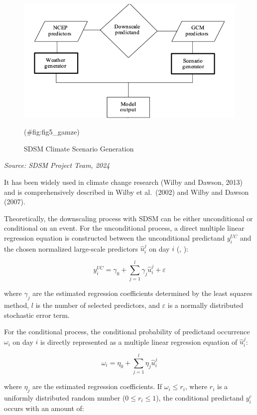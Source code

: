 \documentclass[
]{krantz}
\begin{document}
\begin{figure}

{\centering \includegraphics[width=0.8\linewidth]{./work/06-lowflow/figures/Figure_5} 

}

\caption{SDSM Climate Scenario Generation}(\#fig:fig5\_gamze)
\end{figure}

\emph{Source: SDSM Project Team, 2024}

It has been widely used in climate change research (Wilby and Dawson, 2013) and is comprehensively described in Wilby et al.~(2002) and Wilby and Dawson (2007).

Theoretically, the downscaling process with SDSM can be either unconditional or conditional on an event. For the unconditional process, a direct multiple linear regression equation is constructed between the unconditional predictand \(y_{i}^{UC}\) and the chosen normalized large-scale predictors \(\hat{u}_{i}^{j}\) on day \(i\) (\citet{Wilby2003}, \citet{Wetterhall2006}):

\[
y_{i}^{U C}=\gamma_{0}+\sum_{j=1}^{l} \gamma_{j} \hat{u}_{i}^{j}+\varepsilon \tag{28}
\]

where \(\gamma_{j}\) are the estimated regression coefficients determined by the least squares method, \(l\) is the number of selected predictors, and \(\varepsilon\) is a normally distributed stochastic error term.

For the conditional process, the conditional probability of predictand occurrence \(\omega_{i}\) on day \(i\) is directly represented as a multiple linear regression equation of \(\hat{u}_{i}^{j}\):

\[
\omega_{i}=\eta_{0}+\sum_{j=1}^{l} \eta_{j} \hat{u}_{i}^{j}\tag{29}
\]

where \(\eta_{j}\) are the estimated regression coefficients. If \(\omega_{i} \leqslant r_{i}\), where \(r_{i}\) is a uniformly distributed random number (\(0 \leqslant r_{i} \leqslant 1\)), the conditional predictand \(y_{i}^{c}\) occurs with an amount of:
\end{document}
